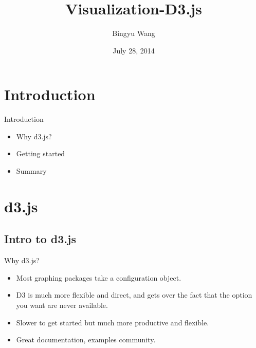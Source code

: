 \documentclass{beamer}
\title[Data Mining]{Visualization-D3.js}
\author{Bingyu Wang \newline {rainicy925@gmail.com}}
\institute{Northeastern University}
\date{July 28, 2014}
\begin{document}
\begin{frame}
  \titlepage
\end{frame}


\section{Introduction}

\begin{frame}{Introduction}

\begin{itemize}
  \item Why d3.js? 
  \item Getting started
  \item Summary
\end{itemize}

\end{frame}

\section{d3.js}

\subsection{Intro to d3.js}

\begin{frame}{Why d3.js?}

\begin{itemize}
	\item Most graphing packages take a configuration object.
	\item D3 is much more flexible and direct, and gets over the fact that the option you want are never available.
	\item Slower to get started but much more productive and flexible. 
	\item Great documentation, examples community.
\end{itemize}



\end{frame}
\end{document}
